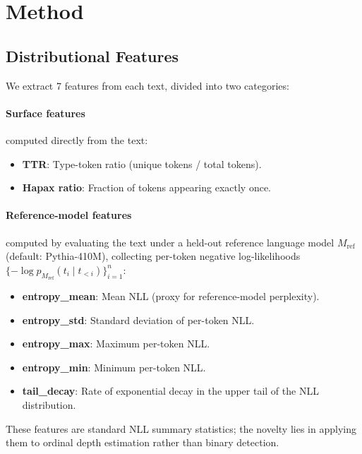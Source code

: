 \documentclass[11pt]{article}
\begin{document}
\section{Method}
\label{sec:method}

\subsection{Distributional Features}
\label{sec:features}

We extract 7 features from each text, divided into two categories:

\paragraph{Surface features} computed directly from the text:
\begin{itemize}
  \item \textbf{TTR}: Type-token ratio (unique tokens / total tokens).
  \item \textbf{Hapax ratio}: Fraction of tokens appearing exactly once.
\end{itemize}

\paragraph{Reference-model features} computed by evaluating the text under a held-out reference language model $M_{\text{ref}}$ (default: Pythia-410M), collecting per-token negative log-likelihoods $\{-\log p_{M_{\text{ref}}}(t_i \mid t_{<i})\}_{i=1}^{n}$:
\begin{itemize}
  \item \textbf{entropy\_mean}: Mean NLL (proxy for reference-model perplexity).
  \item \textbf{entropy\_std}: Standard deviation of per-token NLL.
  \item \textbf{entropy\_max}: Maximum per-token NLL.
  \item \textbf{entropy\_min}: Minimum per-token NLL.
  \item \textbf{tail\_decay}: Rate of exponential decay in the upper tail of the NLL distribution.
\end{itemize}

These features are standard NLL summary statistics; the novelty lies in applying them to ordinal depth estimation rather than binary detection.
\end{document}
